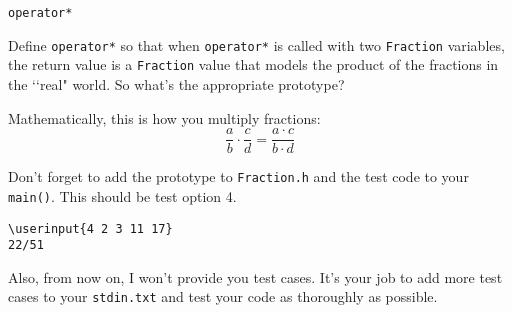 \verb!operator*!

Define \verb!operator*! so that when \verb!operator*! is called with two
\verb!Fraction! variables, the return value is a \verb!Fraction! value that
models the product of the fractions in the \lq\lq real" world. So what's the
appropriate prototype?

Mathematically, this is how you multiply fractions:
\[
\frac{a}{b} \cdot
\frac{c}{d} =
\frac{a \cdot c}{b \cdot d}
\]

Don't forget to add the prototype to \verb!Fraction.h! and the test code to
your \verb!main()!. This should be test option 4.

\resett
\nextt
\begin{Verbatim}[frame=single, commandchars=\\\{\}]
\userinput{4 2 3 11 17}
22/51
\end{Verbatim}

Also, from now on, I won't provide you test cases. It's your job to add more
test cases to your \verb!stdin.txt! and test your code as thoroughly as
possible.
